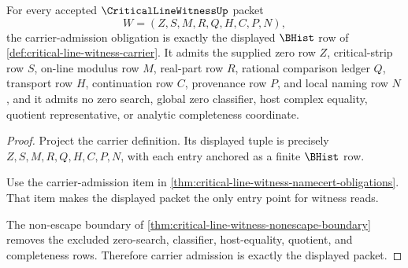 \begin{theorem}
\label{thm:critical-line-witness-obligation-carrier-admission-row}
For every accepted $\CriticalLineWitnessUp$ packet
$$
W=(Z,S,M,R,Q,H,C,P,N),
$$
the carrier-admission obligation is exactly the displayed $\BHist$ row of \autoref{def:critical-line-witness-carrier}. It admits the supplied zero row $Z$, critical-strip row $S$, on-line modulus row $M$, real-part row $R$, rational comparison ledger $Q$, transport row $H$, continuation row $C$, provenance row $P$, and local naming row $N$, and it admits no zero search, global zero classifier, host complex equality, quotient representative, or analytic completeness coordinate.
\end{theorem}
\begin{proof}
Project the carrier definition. Its displayed tuple is precisely $Z,S,M,R,Q,H,C,P,N$, with each entry anchored as a finite $\BHist$ row.

Use the carrier-admission item in \autoref{thm:critical-line-witness-namecert-obligations}. That item makes the displayed packet the only entry point for witness reads.

The non-escape boundary of \autoref{thm:critical-line-witness-nonescape-boundary} removes the excluded zero-search, classifier, host-equality, quotient, and completeness rows. Therefore carrier admission is exactly the displayed packet.
\end{proof}

